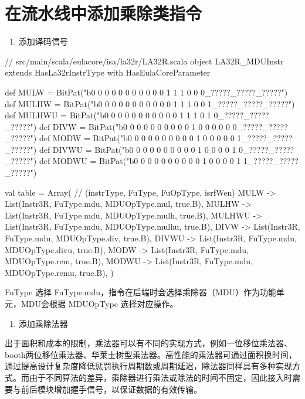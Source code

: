 \section{在流水线中添加乘除类指令}\label{sec:06-more-instructions-006}

\begin{enumerate}
\def\labelenumi{\arabic{enumi}.}
\tightlist
\item
  添加译码信号
\end{enumerate}

\begin{CodeBlock}[language=BookScala]
// src/main/scala/eulacore/isa/la32r/LA32R.scala
object LA32R_MDUInstr extends HasLa32rInstrType with HasEulaCoreParameter {
 def MULW    = BitPat("b0 0 0 0 0 0 0 0 0 0 0 1 1 1 0 0 0_?????_?????_?????")
 def MULHW   = BitPat("b0 0 0 0 0 0 0 0 0 0 0 1 1 1 0 0 1_?????_?????_?????")
 def MULHWU  = BitPat("b0 0 0 0 0 0 0 0 0 0 0 1 1 1 0 1 0_?????_?????_?????")
 def DIVW    = BitPat("b0 0 0 0 0 0 0 0 0 0 1 0 0 0 0 0 0_?????_?????_?????")
 def MODW    = BitPat("b0 0 0 0 0 0 0 0 0 0 1 0 0 0 0 0 1_?????_?????_?????")
 def DIVWU   = BitPat("b0 0 0 0 0 0 0 0 0 0 1 0 0 0 0 1 0_?????_?????_?????")
 def MODWU   = BitPat("b0 0 0 0 0 0 0 0 0 0 1 0 0 0 0 1 1_?????_?????_?????")

 val table = Array( // (instrType, FuType, FuOpType, isrfWen)
   MULW      -> List(Instr3R, FuType.mdu, MDUOpType.mul, true.B),
   MULHW     -> List(Instr3R, FuType.mdu, MDUOpType.mulh, true.B),
   MULHWU    -> List(Instr3R, FuType.mdu, MDUOpType.mulhu, true.B),
   DIVW      -> List(Instr3R, FuType.mdu, MDUOpType.div, true.B),
   DIVWU     -> List(Instr3R, FuType.mdu, MDUOpType.divu, true.B),
   MODW      -> List(Instr3R, FuType.mdu, MDUOpType.rem, true.B),
   MODWU     -> List(Instr3R, FuType.mdu, MDUOpType.remu, true.B),
 )
}
\end{CodeBlock}

FuType 选择 FuType.mdu，指令在后端时会选择乘除器（MDU）作为功能单元，MDU会根据 MDUOpType 选择对应操作。

\begin{enumerate}
\def\labelenumi{\arabic{enumi}.}
\setcounter{enumi}{1}
\tightlist
\item
  添加乘除法器
\end{enumerate}

出于面积和成本的限制，乘法器可以有不同的实现方式，例如一位移位乘法器、booth两位移位乘法器、华莱士树型乘法器。高性能的乘法器可通过面积换时间，通过提高设计复杂度降低惩罚执行周期数或周期延迟，除法器同样具有多种实现方式。而由于不同算法的差异，乘除器进行乘法或除法的时间不固定，因此接入时需要与前后模块增加握手信号，以保证数据的有效传输。

